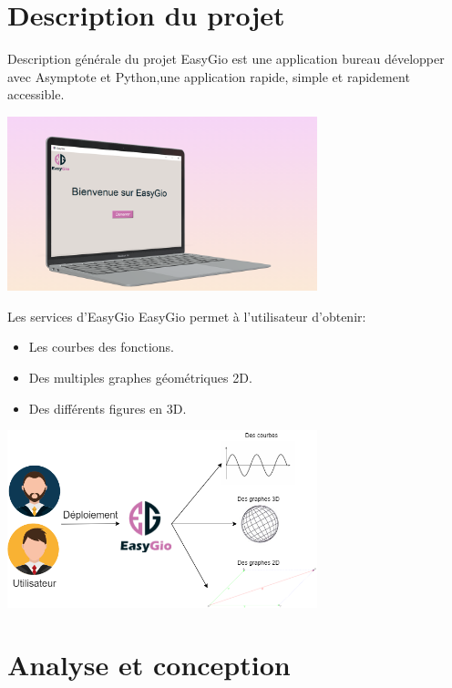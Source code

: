\documentclass{beamer}
\begin{document}
\section{Description du projet}
\begin{frame}{Description générale du projet}
EasyGio est une application bureau développer avec Asymptote et Python,une application rapide, simple et rapidement accessible.
\begin{center}
    \includegraphics[width=9cm]{pic/previewed.png}
\end{center}
\end{frame}
\begin{frame}{Les services d'EasyGio}
EasyGio permet à l'utilisateur d'obtenir:
\begin{itemize}[<+-| alert@+>]
    \item Les courbes des fonctions.
    \item Des multiples graphes géométriques 2D.
    \item Des différents figures en 3D.
\end{itemize}
    \centering
    \includegraphics[width=9cm]{pic/EasyGioServices.png}
\end{frame}
\section{Analyse et conception }
\end{document}

